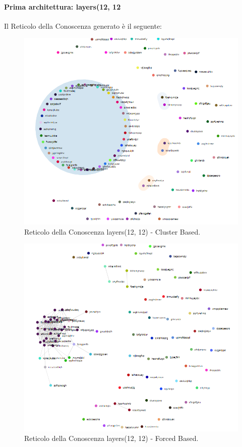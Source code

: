 \paragraph{Prima architettura: layers(12, 12}
\label{Prima architettura}

Il Reticolo della Conoscenza generato è il seguente:
\begin{figure}[H]
\centering
	\includegraphics[width=0.60\linewidth]{./image/logica(12,12).png}
	\caption{Reticolo della Conoscenza layers(12, 12) - Cluster Based.}
	\label{Reticolo della Conoscenza layers(12, 12) - Cluster Based.}
\end{figure}
\noindent

\begin{figure}[H]
\centering
	\includegraphics[width=0.60\linewidth]{./image/logica(12,12)_forced.png}
	\caption{Reticolo della Conoscenza layers(12, 12) - Forced Based.}
	\label{Reticolo della Conoscenza layers(12, 12) - Forced Based.}
\end{figure}
\noindent

